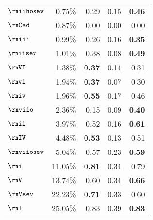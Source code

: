 \begin{tabular}{l|rrrr}
$\rniihosev$   & 0.75\%                 & 0.29                 & 0.15                        & \textbf{0.46}  \\
$\rnCad$       & 0.87\%                 & 0.00                 & 0.00                        & 0.00           \\
$\rniii$       & 0.99\%                 & 0.26                 & 0.16                        & \textbf{0.35}  \\
$\rniisev$     & 1.01\%                 & 0.38                 & 0.08                        & \textbf{0.49}  \\
$\rnVI$        & 1.38\%                 & \textbf{0.37}        & 0.14                        & 0.31           \\
$\rnvi$        & 1.94\%                 & \textbf{0.37}        & 0.07                        & 0.30           \\
$\rniv$        & 1.96\%                 & \textbf{0.55}        & 0.17                        & 0.46           \\
$\rnviio$      & 2.36\%                 & 0.15                 & 0.09                        & \textbf{0.40}  \\
$\rnii$        & 3.97\%                 & 0.52                 & 0.16                        & \textbf{0.61}  \\
$\rnIV$        & 4.48\%                 & \textbf{0.53}        & 0.13                        & 0.51           \\
$\rnviiosev$   & 5.04\%                 & 0.57                 & 0.23                        & \textbf{0.59}  \\
$\rni$         & 11.05\%                & \textbf{0.81}        & 0.34                        & 0.79           \\
$\rnV$         & 13.74\%                & 0.60                 & 0.34                        & \textbf{0.66}  \\
$\rnVsev$      & 22.23\%                & \textbf{0.71}        & 0.33                        & 0.60           \\
$\rnI$         & 25.05\%                & 0.83                 & 0.39                        & \textbf{0.83}     
\end{tabular}
